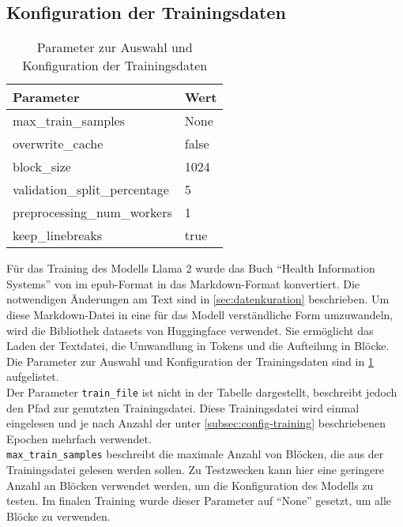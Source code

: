\subsection{Konfiguration der Trainingsdaten}
\begin{table}
    \centering
    \begin{tabular}{ll}
        \toprule
        \textbf{Parameter}            & \textbf{Wert} \\
        \midrule
        max\_train\_samples           & None          \\
        overwrite\_cache              & false         \\
        block\_size                   & 1024          \\
        validation\_split\_percentage & 5             \\
        preprocessing\_num\_workers   & 1             \\
        keep\_linebreaks              & true          \\
        \bottomrule
    \end{tabular}
    \caption{Parameter zur Auswahl und Konfiguration der Trainingsdaten}\label{tab:data-config}
\end{table}
Für das Training des Modells Llama 2 wurde das Buch \enquote{Health Information Systems} von \citet{bb} im epub-Format in das Markdown-Format konvertiert.
Die notwendigen Änderungen am Text sind in \cref{sec:datenkuration} beschrieben.
Um diese Markdown-Datei in eine für das Modell verständliche Form umzuwandeln, wird die Bibliothek datasets \citep{datasets} von Huggingface verwendet.
Sie ermöglicht das Laden der Textdatei, die Umwandlung in Tokens und die Aufteilung in Blöcke.
Die Parameter zur Auswahl und Konfiguration der Trainingsdaten sind in \cref{tab:data-config} aufgelistet.\\

Der Parameter \texttt{train\_file} ist nicht in der Tabelle dargestellt, beschreibt jedoch den Pfad zur genutzten Trainingsdatei.
Diese Trainingsdatei wird einmal eingelesen und je nach Anzahl der unter \cref{subsec:config-training} beschriebenen Epochen mehrfach verwendet.\\

\texttt{max\_train\_samples} beschreibt die maximale Anzahl von Blöcken, die aus der Trainingsdatei gelesen werden sollen.
Zu Testzwecken kann hier eine geringere Anzahl an Blöcken verwendet werden, um die Konfiguration des Modells zu testen.
Im finalen Training wurde dieser Parameter auf \enquote{None} gesetzt, um alle Blöcke zu verwenden.\\

